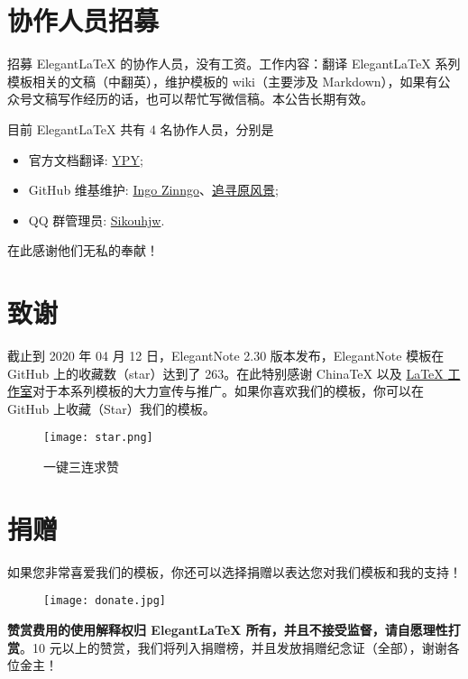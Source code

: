 \documentclass[cn,hazy,blue,14pt,screen]{elegantnote}
\begin{document}
\section{协作人员招募}

招募 Elegant\LaTeX{} 的协作人员，没有工资。工作内容：翻译 Elegant\LaTeX{} 系列模板相关的文稿（中翻英），维护模板的 wiki（主要涉及 Markdown），如果有公众号文稿写作经历的话，也可以帮忙写微信稿。本公告长期有效。

目前 ElegantLaTeX 共有 4 名协作人员，分别是
\begin{itemize}
    \item 官方文档翻译: \href{https://github.com/peggy2006xzyz}{YPY};
    \item GitHub 维基维护: \href{https://github.com/izinngo}{Ingo Zinngo}、\href{https://github.com/xiaohao890809}{追寻原风景};
    \item QQ 群管理员: \href{https://github.com/sikouhjw}{Sikouhjw}.
\end{itemize}

在此感谢他们无私的奉献！


\section{致谢}

截止到 2020 年 04 月 12 日，ElegantNote 2.30 版本发布，ElegantNote 模板在 GitHub 上的收藏数（star）达到了 263。在此特别感谢 China\TeX{} 以及 \href{http://www.latexstudio.net/}{\LaTeX{} 工作室}对于本系列模板的大力宣传与推广。如果你喜欢我们的模板，你可以在 GitHub 上收藏（Star）我们的模板。

\begin{figure}[htbp]
    \centering
    \texttt{[image: star.png]}
    \caption{一键三连求赞}
\end{figure}


\section{捐赠}

如果您非常喜爱我们的模板，你还可以选择捐赠以表达您对我们模板和我的支持！

\begin{figure}[htbp]
    \centering
    \texttt{[image: donate.jpg]}
\end{figure}

\textbf{赞赏费用的使用解释权归 Elegant\LaTeX{} 所有，并且不接受监督，请自愿理性打赏}。10 元以上的赞赏，我们将列入捐赠榜，并且发放捐赠纪念证（全部），谢谢各位金主！
\end{document}
